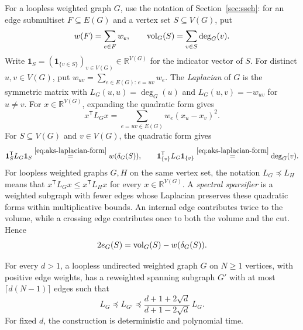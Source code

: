 For a loopless weighted graph $G$, use the notation of
Section~\ref{sec:sseh}: for an edge submultiset $F\subseteq E(G)$
and a vertex set $S\subseteq V(G)$, put
\[
 w(F)=\sum_{e\in F}w_e,\qquad
 \operatorname{vol}_G(S)=\sum_{v\in S}\deg_G(v).
\]
Write $\mathbf1_S=(\mathbf1_{\{v\in S\}})_{v\in V(G)}
\in\mathbb R^{V(G)}$ for the indicator vector of $S$.
For distinct $u,v\in V(G)$, put
$w_{uv}=\sum_{e\in E(G):\,e=uv}w_e$.
The \emph{Laplacian} of $G$ is the symmetric matrix with
$L_G(u,u)=\deg_G(u)$ and $L_G(u,v)=-w_{uv}$ for $u\ne v$.
For $x\in\mathbb R^{V(G)}$, expanding the quadratic form gives
\begin{equation}\label{eq:aks-laplacian-form}
 x^{\mathsf T}L_Gx
 =\sum_{e=uv\in E(G)}w_e(x_u-x_v)^2.
\end{equation}
For $S\subseteq V(G)$ and $v\in V(G)$, the quadratic form gives
\begin{equation}\label{eq:aks-indicator-forms}
\mathbf1_S^{\mathsf T}L_G\mathbf1_S
 \overset{\eqref{eq:aks-laplacian-form}}{=}w(\delta_G(S)),
 \qquad \mathbf1_{\{v\}}^{\mathsf T}L_G\mathbf1_{\{v\}}
 \overset{\eqref{eq:aks-laplacian-form}}{=}\deg_G(v).
\end{equation}
For loopless weighted graphs $G,H$ on the same vertex set, the notation
$L_G\preceq L_H$ means that
$x^{\mathsf T}L_Gx\le x^{\mathsf T}L_Hx$ for every
$x\in\mathbb R^{V(G)}$.
A \emph{spectral sparsifier} is a weighted subgraph with fewer
edges whose Laplacian preserves these quadratic forms within
multiplicative bounds. An internal edge contributes twice to the
volume, while a crossing edge contributes once to both the volume
and the cut. Hence
\begin{equation}\label{eq:aks-volume-cut}
 2e_G(S)=\operatorname{vol}_G(S)-w(\delta_G(S)).
\end{equation}

\begin{theorem}
\label{thm:bss-spectral-sparsification}
For every $d>1$, a loopless undirected weighted graph $G$ on $N\ge1$
vertices, with positive edge weights, has a reweighted spanning
subgraph $G'$ with at most
$\lceil d(N-1)\rceil$ edges such that
\[
 L_G\preceq L_{G'}\preceq
 \frac{d+1+2\sqrt d}{d+1-2\sqrt d}\,L_G.
\]
For fixed $d$, the construction is deterministic and polynomial time.
\end{theorem}



